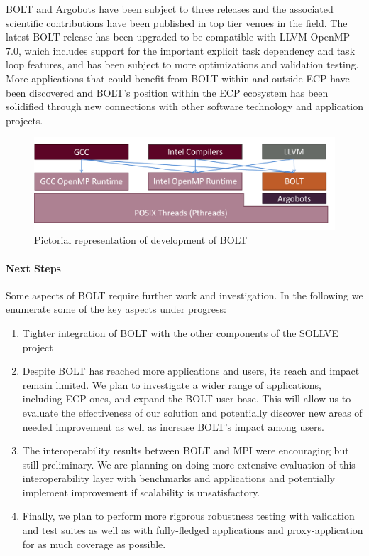 BOLT and Argobots have been subject to three releases and the
associated scientific contributions have been published in top tier
venues in the field.  The latest BOLT release has been upgraded to be
compatible with LLVM OpenMP 7.0, which includes support for the
important explicit task dependency and task loop features, and has
been subject to more optimizations and validation testing. More
applications that could benefit from BOLT within and outside ECP have
been discovered and BOLT's position within the ECP ecosystem has been
solidified through new connections with other software technology and
application projects.

\begin{figure}[htb]
  \centering
  \vspace{2.0ex}
  \includegraphics[width=0.9\columnwidth]{projects/2.3.2-Tools/2.3.2.11-SOLLVE/SOLLVE-BOLT.pdf}
  \caption{\label{fig:sollve-bolt}Pictorial representation of development of BOLT}
  \vspace{2.0ex}
\end{figure}

\paragraph{Next Steps}

Some aspects of BOLT require further work and investigation.  In the
following we enumerate some of the key aspects under progress:

\begin{enumerate}

\item Tighter integration of BOLT with the other components of the
SOLLVE project

\item Despite BOLT has reached more applications and users, its reach
and impact remain limited.  We plan to investigate a wider range of
applications, including ECP ones, and expand the BOLT user base.  This
will allow us to evaluate the effectiveness of our solution and
potentially discover new areas of needed improvement as well as
increase BOLT's impact among users.

\item The interoperability results between BOLT and MPI were
  encouraging but still preliminary.  We are planning on doing more
  extensive evaluation of this interoperability layer with benchmarks
  and applications and potentially implement improvement if
  scalability is unsatisfactory.

\item Finally, we plan to perform more rigorous robustness testing
  with validation and test suites as well as with fully-fledged
  applications and proxy-application for as much coverage as possible.

\end{enumerate}

